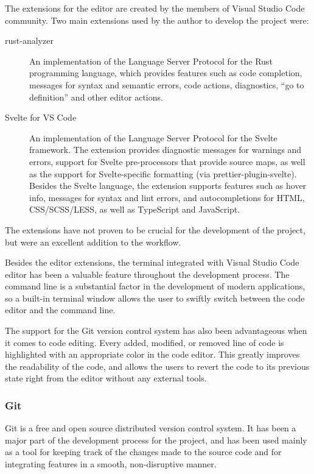 \documentclass[english,engineering]{wizthesis}
\begin{document}
The extensions for the editor are created by the members of Visual Studio Code
community. Two main extensions used by the author to develop the project were:
\begin{description}
  \item[rust-analyzer] \cite{rust-analyzer} An implementation of the Language
  Server Protocol for the Rust programming language, which provides features
  such as code completion, messages for syntax and semantic errors, code
  actions, diagnostics, ``go to definition'' and other editor actions.
  \item[Svelte for VS Code] \cite{svelte-for-vs-code} An implementation of the
  Language Server Protocol for the Svelte framework. The extension provides
  diagnostic messages for warnings and errors, support for Svelte pre-processors
  that provide source maps, as well as the support for Svelte-specific
  formatting (via prettier-plugin-svelte). Besides the Svelte language, the
  extension supports features such as hover info, messages for syntax and lint
  errors, and autocompletions for HTML, CSS/SCSS/LESS, as well as TypeScript and
  JavaScript.
\end{description}
The extensions have not proven to be crucial for the development of the project,
but were an excellent addition to the workflow.

Besides the editor extensions, the terminal integrated with Visual Studio Code
editor has been a valuable feature throughout the development process. The
command line is a substantial factor in the development of modern applications,
so a built-in terminal window allows the user to swiftly switch between the code
editor and the command line.

The support for the Git version control system has also been advantageous when
it comes to code editing. Every added, modified, or removed line of code is
highlighted with an appropriate color in the code editor. This greatly improves
the readability of the code, and allows the users to revert the code to its
previous state right from the editor without any external tools.

\subsubsection*{Git}

Git \cite{git} is a free and open source distributed version control system. It
has been a major part of the development process for the project, and has been
used mainly as a tool for keeping track of the changes made to the source code
and for integrating features in a smooth, non-disruptive manner.
\end{document}
